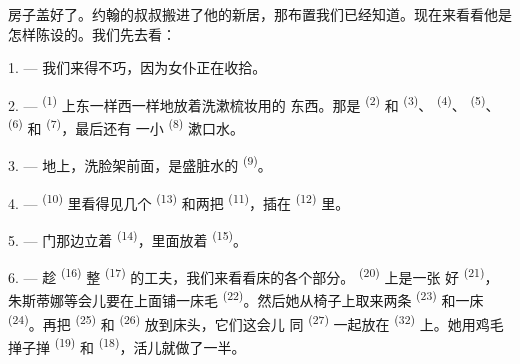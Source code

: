 %
%

\VUsaut{6.0mm}
\VUsaut{1.4mm}
\VUsaut{0.4mm}
\VUsaut{2.2mm}

房子盖好了。约翰的叔叔搬进了他的新居，那布置我们已经知道。现在来看看他是
怎样陈设的。我们先去看：

\VUsaut{3.0mm}

1. --- 我们来得不巧，因为女仆正在收拾。

2. ---  \textsuperscript{(1)} 上东一样西一样地放着洗漱梳妆用的
东西。那是 \textsuperscript{(2)} 和 \textsuperscript{(3)}、
 \textsuperscript{(4)}、 \textsuperscript{(5)}、
 \textsuperscript{(6)} 和 \textsuperscript{(7)}，最后还有
一小 \textsuperscript{(8)} 漱口水。

3. --- 地上，洗脸架前面，是盛脏水的 \textsuperscript{(9)}。

4. ---  \textsuperscript{(10)} 里看得见几个
\textsuperscript{(13)} 和两把 \textsuperscript{(11)}，插在
\textsuperscript{(12)} 里。

5. --- 门那边立着 \textsuperscript{(14)}，里面放着
\textsuperscript{(15)}。

6. --- 趁 \textsuperscript{(16)} 整 \textsuperscript{(17)}
的工夫，我们来看看床的各个部分。 \textsuperscript{(20)} 上是一张
好 \textsuperscript{(21)}，朱斯蒂娜等会儿要在上面铺一床毛
 \textsuperscript{(22)}。然后她从椅子上取来两条
\textsuperscript{(23)} 和一床 \textsuperscript{(24)}。再把
\textsuperscript{(25)} 和 \textsuperscript{(26)} 放到床头，它们这会儿
同 \textsuperscript{(27)} 一起放在 \textsuperscript{(32)}
上。她用鸡毛掸子掸 \textsuperscript{(19)} 和
\textsuperscript{(18)}，活儿就做了一半。

